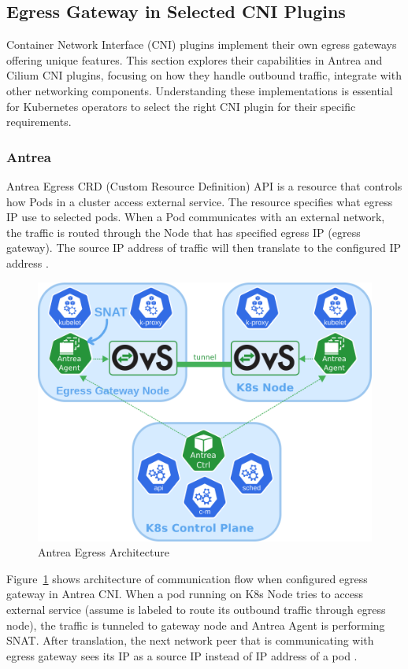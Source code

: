 \subsection{Egress Gateway in Selected CNI Plugins}
\label{subsection:egressGateway}

Container Network Interface (CNI) plugins implement their own egress gateways offering unique features. This section explores their capabilities in Antrea and Cilium CNI plugins, focusing on how they handle outbound traffic, integrate with other networking components. Understanding these implementations is essential for Kubernetes operators to select the right CNI plugin for their specific requirements.


\subsubsection{Antrea}
\label{subsection:antreaEgress}

Antrea Egress CRD (Custom Resource Definition) API is a resource that controls how Pods in a cluster access external service. The resource specifies what egress IP use to selected pods. When a Pod communicates with an external network, the traffic is routed through the Node that has specified egress IP (egress gateway). The source IP address of traffic will then translate to the configured IP address \cite{AntreaEgressArch}.

\begin{figure}[tbh]
    \centering
    \includegraphics[width=0.6\columnwidth]{images/antrea_overview.png}
    \caption{Antrea Egress Architecture \cite{AntreaEgressArch}}
    \label{fig:antreaEgressArch}
\end{figure}


Figure~\ref{fig:antreaEgressArch} shows architecture of communication flow when configured egress gateway in Antrea CNI. When a pod running on K8s Node tries to access external service (assume is labeled to route its outbound traffic through egress node), the traffic is tunneled to gateway node and Antrea Agent is performing SNAT. After translation, the next network peer that is communicating with egress gateway sees its IP as a source IP instead of IP address of a pod \cite{AntreaEgressArch} \cite{AntreaSNAT}. 

